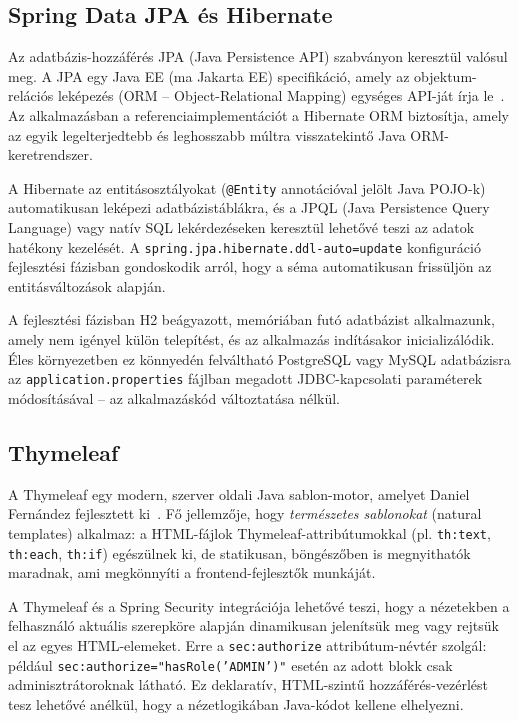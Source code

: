\subsection{Spring Data JPA és Hibernate}

Az adatbázis-hozzáférés JPA (Java Persistence API) szabványon keresztül valósul meg. A JPA egy Java EE (ma Jakarta EE) specifikáció, amely az objektum-relációs leképezés (ORM – Object-Relational Mapping) egységes API-ját írja le~\cite{bauer2015java}. Az alkalmazásban a referenciaimplementációt a Hibernate ORM biztosítja, amely az egyik legelterjedtebb és leghosszabb múltra visszatekintő Java ORM-keretrendszer.

A Hibernate az entitásosztályokat (\texttt{@Entity} annotációval jelölt Java POJO-k) automatikusan leképezi adatbázistáblákra, és a JPQL (Java Persistence Query Language) vagy natív SQL lekérdezéseken keresztül lehetővé teszi az adatok hatékony kezelését. A \texttt{spring.jpa.hibernate.ddl-auto=update} konfiguráció fejlesztési fázisban gondoskodik arról, hogy a séma automatikusan frissüljön az entitásváltozások alapján.

A fejlesztési fázisban H2 beágyazott, memóriában futó adatbázist alkalmazunk, amely nem igényel külön telepítést, és az alkalmazás indításakor inicializálódik. Éles környezetben ez könnyedén felváltható PostgreSQL vagy MySQL adatbázisra az \texttt{application.properties} fájlban megadott JDBC-kapcsolati paraméterek módosításával – az alkalmazáskód változtatása nélkül.

\subsection{Thymeleaf}

A Thymeleaf egy modern, szerver oldali Java sablon-motor, amelyet Daniel Fernández fejlesztett ki~\cite{fernandez2023thymeleaf}. Fő jellemzője, hogy \textit{természetes sablonokat} (natural templates) alkalmaz: a HTML-fájlok Thymeleaf-attribútumokkal (pl. \texttt{th:text}, \texttt{th:each}, \texttt{th:if}) egészülnek ki, de statikusan, böngészőben is megnyithatók maradnak, ami megkönnyíti a frontend-fejlesztők munkáját.

A Thymeleaf és a Spring Security integrációja lehetővé teszi, hogy a nézetekben a felhasználó aktuális szerepköre alapján dinamikusan jelenítsük meg vagy rejtsük el az egyes HTML-elemeket. Erre a \texttt{sec:authorize} attribútum-névtér szolgál: például \texttt{sec:authorize="hasRole('ADMIN')"} esetén az adott blokk csak adminisztrátoroknak látható. Ez deklaratív, HTML-szintű hozzáférés-vezérlést tesz lehetővé anélkül, hogy a nézetlogikában Java-kódot kellene elhelyezni.


